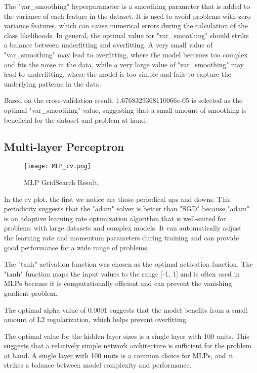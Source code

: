 \documentclass{article}
\begin{document}
The "var\_smoothing" hyperparameter is a smoothing parameter that is added to the variance of each feature in the dataset. It is used to avoid problems with zero variance features, which can cause numerical errors during the calculation of the class likelihoods. In general, the optimal value for "var\_smoothing" should strike a balance between underfitting and overfitting. A very small value of "var\_smoothing" may lead to overfitting, where the model becomes too complex and fits the noise in the data, while a very large value of "var\_smoothing" may lead to underfitting, where the model is too simple and fails to capture the underlying patterns in the data.

Based on the cross-validation result, 1.6768329368110066e-05 is selected as the optimal "var\_smoothing" value, suggesting that a small amount of smoothing is beneficial for the dataset and problem at hand.


\subsection{Multi-layer Perceptron}

\begin{figure}[h]
  \centering
  \texttt{[image: MLP\_cv.png]}
  \caption{MLP GridSearch Result.}
\end{figure}

In the cv plot, the first we notice are those periodical ups and downs. This periodicity suggests that the "adam" solver is better than "SGD" because "adam" is an adaptive learning rate optimization algorithm that is well-suited for problems with large datasets and complex models. It can automatically adjust the learning rate and momentum parameters during training and can provide good performance for a wide range of problems. 

The "tanh" activation function was chosen as the optimal activation function. The "tanh" function maps the input values to the range [-1, 1] and is often used in MLPs because it is computationally efficient and can prevent the vanishing gradient problem. 

The optimal alpha value of 0.0001 suggests that the model benefits from a small amount of L2 regularization, which helps prevent overfitting. 

The optimal value for the hidden layer sizes is a single layer with 100 units. This suggests that a relatively simple network architecture is sufficient for the problem at hand. A single layer with 100 units is a common choice for MLPs, and it strikes a balance between model complexity and performance. 
\end{document}
